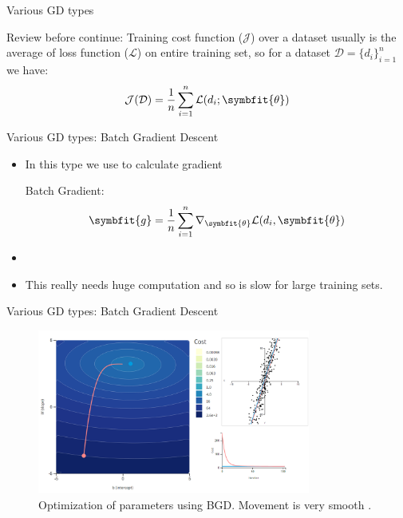 \begin{frame}{Various GD types}
	\begin{block}{Review before continue:}
		Training cost function ($\mathcal{J}$) over a dataset usually is the average of loss function ($\mathcal{L}$) on entire training set, so for a dataset $\mathcal{D}=\{d_i\}_{i=1}^n$ we have:
		\[
		\mathcal{J}(\mathcal{D}) = \frac{1}{n} \sum_{i=1}^{n} \mathcal{L}(d_i; \symbfit{\theta})
		\] 
	\end{block}
\end{frame}

\begin{frame}{Various GD types: Batch Gradient Descent}
	\begin{itemize}
		\item In this type we use  to calculate gradient
		\begin{block}{Batch Gradient:}
			\[
			\symbfit{g} = \frac{1}{n}\sum_{i=1}^n \nabla_{\symbfit{\theta}} \mathcal{L}(d_i, \symbfit{\theta})
			\]
		\end{block}
		\item[]
		\item This really needs huge computation and so is slow for large training sets.
	\end{itemize}
\end{frame}

\begin{frame}{Various GD types: Batch Gradient Descent}
	\begin{figure}[H]
		\centering
		\includegraphics[width=0.8\textwidth]{Images/bgd.png}
		\caption{Optimization of parameters using BGD. Movement is very smooth \cite{katanforoosh-kunin-opt}.}
	\end{figure} 
\end{frame}

